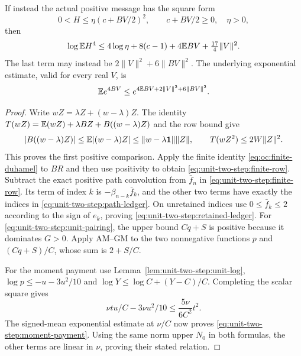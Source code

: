 \begin{theorem}
If instead the actual positive message has the square form
\[
 0<H\le\eta(c+BV/2)^2,\qquad c+BV/2\ge0,\quad\eta>0,
\]
then
\begin{equation}\label{eq:unit-two-step:square-log-scale}
 \log\mathbb E H^4\le4\log\eta+8(c-1)+4\mathbb E BV
                  +\tfrac{17}{4}\|V\|^2.
\end{equation}
The last term may instead be $2\|V\|^2+6\|BV\|^2$.
The underlying exponential estimate, valid for every real $V$, is
\begin{equation}\label{eq:unit-two-step:variance-exponential}
 \mathbb E e^{4BV}\le e^{4\mathbb E BV+2\|V\|^2+6\|BV\|^2}.
\end{equation}

\end{theorem}

\begin{proof}
Write $wZ=\lambda Z+(w-\lambda)Z$. The identity
$T(wZ)=\mathbb E(wZ)+\lambda BZ+B((w-\lambda)Z)$ and the row bound give
\[
|B((w-\lambda)Z)|\le\mathbb E|(w-\lambda)Z|
                  \le\|w-\lambda\mathbf1\|\|Z\|,
 \qquad T(wZ^2)\le2W\|Z\|^2.
\]
This proves the first positive comparison. Apply the finite identity
\eqref{eq:oc:finite-duhamel} to
$BR$ and then use positivity to obtain
\eqref{eq:unit-two-step:finite-row}. Subtract the exact positive path convolution from $\bar f_n$ in
\eqref{eq:unit-two-step:finite-row}. Its term of index $k$ is
$-\beta_{n-k}\bar f_k$, and the other two terms have exactly the
indices in \eqref{eq:unit-two-step:path-ledger}. On unretained indices use
$0\le\bar f_k\le2$ according to the sign of $e_k$, proving
\eqref{eq:unit-two-step:retained-ledger}.
For \eqref{eq:unit-two-step:unit-pairing}, the upper bound
$Cq+S$ is positive because it dominates $G>0$.
Apply AM--GM to the two nonnegative functions $p$ and
$(Cq+S)/C$, whose sum is $2+S/C$.

For the moment payment use Lemma~\ref{lem:unit-two-step:unit-log},
$\log p\le-u-3u^2/10$ and
$\log Y\le\log C+(Y-C)/C$. Completing the scalar square gives
\[
 \nu t u/C-3\nu u^2/10\le\frac{5\nu}{6C^2}t^2.
\]
The signed-mean exponential estimate at $\nu/C$ now proves
\eqref{eq:unit-two-step:moment-payment}.
Using the same norm upper $N_0$ in both formulas, the other
terms are linear in $\nu$, proving their stated relation.


\end{proof}
